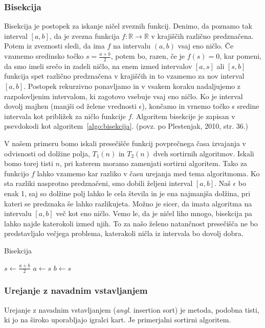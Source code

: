 \documentclass[a4paper,oneside,12pt]{article}
\def\R{\mathbb R}
\begin{document}
\subsubsection{Bisekcija}
Bisekcija je postopek za iskanje ničel zveznih funkcij. Denimo, da poznamo tak interval $[a, b]$,
da je zvezna funkcija $f\!\!: \R \rightarrow \R$ v krajiščih različno predznačena.
Potem iz zveznosti sledi, da ima $f$ na
intervalu $(a, b)$ vsaj eno ničlo. Če vzamemo sredinsko točko $s = \frac{a + b}{2}$, potem bo, razen,
če je $f(s) = 0$, kar pomeni, da smo imeli srečo in zadeli ničlo, na enem izmed intervalov $[a, s]$
ali $[s, b]$ funkcija spet različno predznačena v krajiščih in to vzamemo za nov interval $[a, b]$. 
Postopek rekurzivno ponavljamo in v vsakem koraku nadaljujemo z razpolovljenim intervalom,
ki zagotovo vsebuje vsaj eno ničlo. Ko je interval dovolj majhen (manjši od želene vrednosti $\epsilon$), končamo in vrnemo točko s
sredine intervala kot približek za ničlo funkcije $f$. Algoritem bisekcije je zapisan v psevdokodi kot 
algoritem~\ref{algo:bisekcija}.
(povz. po Plestenjak, 2010, str. 36.) 

V našem primeru bomo iskali presečišče funkcij povprečnega časa izvajanja v odvisnosti od dolžine polja, $T_1(n)$ in 
$T_2(n)$ dveh sortirnih algoritmov. Iskali bomo torej tisti $n$, pri katerem moramo zamenjati sortirni algoritem. 
Tako za funkcijo $f$ lahko vzamemo kar razliko v času urejanja med tema algoritmoma.
Ko sta razliki nasprotno predznačeni,
smo dobili željeni interval $[a, b]$. Naš $\epsilon$ bo enak 1, saj so dolžine polj lahko le cela števila
in je ena najmanjša dolžina, pri kateri se predznaka še lahko razlikujeta.
Možno je sicer, da imata algoritma na intervalu $[a, b]$ več kot eno ničlo. 
Vemo le, da je ničel liho mnogo, bisekcija pa lahko najde katerokoli izmed njih.
To za našo želeno natančnost presečišča ne bo predstavljalo večjega problema, katerakoli 
ničla iz intervala bo dovolj dobra.

\begin{algorithm}[h!t!]
  \caption{Bisekcija}\label{algo:bisekcija}
  \begin{algorithmic}[1]
        \State $s \gets \frac{a+b}{2}$
          \State $a \gets s$
        \Else
          \State $b \gets s$
        \EndIf
    \EndWhile
  \end{algorithmic}
\end{algorithm}

\subsubsection{Urejanje z navadnim vstavljanjem}
\label{chapter:insertionsort}
Urejanje z navadnim vstavljanjem (\emph{angl.} insertion sort) je metoda,
podobna tisti, ki jo na široko uporabljajo igralci kart. Je primerjalni sortirni algoritem.
\end{document}
